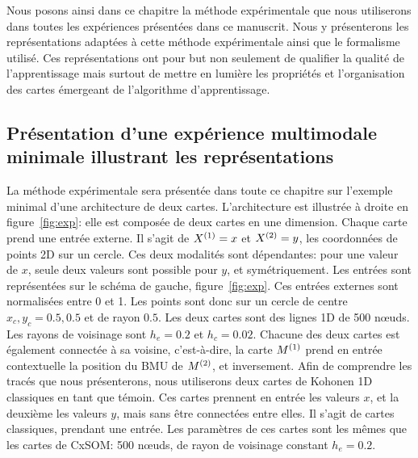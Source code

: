 \documentclass[../main]{subfiles}
\begin{document}
Nous posons ainsi dans ce chapitre la méthode expérimentale que nous utiliserons dans toutes les expériences présentées dans ce manuscrit. Nous y présenterons les représentations adaptées à cette méthode expérimentale ainsi que le formalisme utilisé. Ces représentations ont pour but non seulement de qualifier la qualité de l'apprentissage mais surtout de mettre en lumière les propriétés et l'organisation des cartes émergeant de l'algorithme d'apprentissage. 

\subsection{Présentation d'une expérience multimodale minimale illustrant les représentations}

La méthode expérimentale sera présentée dans toute ce chapitre sur l'exemple minimal d'une architecture de deux cartes. L'architecture est illustrée à droite en figure~\ref{fig:exp}: elle est composée de deux cartes en une dimension. Chaque carte prend une entrée externe. Il s'agit de $X^{({1})}=x$ et $X^{({2})}=y$, les coordonnées de points 2D sur un cercle. Ces deux modalités sont dépendantes: pour une valeur de $x$, seule deux valeurs sont possible pour $y$, et symétriquement. Les entrées sont représentées sur le schéma de gauche, figure~\ref{fig:exp}.
Ces entrées externes sont normalisées entre 0 et 1. Les points sont donc sur un cercle de centre $x_c,y_c = 0.5,0.5$ et de rayon $0.5$.
Les deux cartes sont des lignes 1D de 500 n\oe{}uds. Les rayons de voisinage sont $h_e = 0.2$ et $h_c = 0.02$.
Chacune des deux cartes est également connectée à sa voisine, c'est-à-dire, la carte $M^{({1})}$ prend en entrée contextuelle la position du BMU de $M^{({2})}$, et inversement.
Afin de comprendre les tracés que nous présenterons, nous utiliserons deux cartes de Kohonen 1D classiques en tant que témoin.
Ces cartes prennent en entrée les valeurs $x$, et la deuxième les valeurs $y$, mais sans être connectées entre elles. Il s'agit de cartes classiques, prendant une entrée. Les paramètres de ces cartes sont les mêmes que les cartes de CxSOM: 500 n\oe{}uds, de rayon de voisinage constant $h_e = 0.2$.
\end{document}
